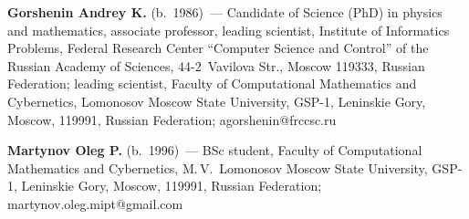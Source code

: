 \Contr


\noindent
\textbf{Gorshenin Andrey K.} (b.\ 1986)~--- 
Candidate of Science (PhD) in physics and
mathematics, associate professor, leading scientist, Institute of Informatics Problems,
Federal Research Center ``Computer Science and Control'' of the Russian Academy of
Sciences, 44-2~Vavilova Str., Moscow 119333, Russian Federation;  leading scientist, Faculty
of Computational Mathematics and Cybernetics, Lomonosov Moscow State 
University, GSP-1,
Leninskie Gory, Moscow, 119991, Russian Federation; \mbox{agorshenin@frccsc.ru}

\vspace*{3pt}

\noindent
\textbf{Martynov Oleg P.} (b.\ 1996)~--- BSc student,  Faculty
of Computational Mathematics and Cybernetics, 
M.\,V.~Lomonosov Moscow State University, GSP-1,
Leninskie Gory, Moscow, 119991, Russian Federation; 
\mbox{martynov.oleg.mipt@gmail.com}
\label{end\stat}

\renewcommand{\bibname}{\protect\rm Литература}  